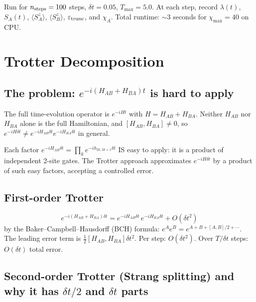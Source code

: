 \documentclass[11pt, a4paper]{article}
\begin{document}
Run for $n_{\rm steps} = 100$ steps, $\delta t = 0.05$, $T_{\max} = 5.0$. At each step, record $\lambda(t)$, $S_A(t)$, $\langle S^z_A\rangle$, $\langle S^z_B\rangle$, $\varepsilon_{\rm trunc}$, and $\chi_A$. Total runtime: $\sim$3 seconds for $\chi_{\max} = 40$ on CPU.

\section{Trotter Decomposition}
\label{sec:trotter}

\subsection{The problem: $e^{-i(H_{AB}+H_{BA})t}$ is hard to apply}

The full time-evolution operator is $e^{-iHt}$ with $H = H_{AB} + H_{BA}$. Neither $H_{AB}$ nor $H_{BA}$ alone is the full Hamiltonian, and $[H_{AB}, H_{BA}] \neq 0$, so $e^{-iH\delta t} \neq e^{-iH_{AB}\delta t} e^{-iH_{BA}\delta t}$ in general.

Each factor $e^{-iH_{AB}\delta t} = \prod_k e^{-ih_{2k,2k+1}\delta t}$ IS easy to apply: it is a product of independent 2-site gates. The Trotter approach approximates $e^{-iH\delta t}$ by a product of such easy factors, accepting a controlled error.

\subsection{First-order Trotter}

\begin{equation}
  e^{-i(H_{AB}+H_{BA})\delta t} = e^{-iH_{AB}\delta t}\, e^{-iH_{BA}\delta t} + O(\delta t^2)
\end{equation}
by the Baker--Campbell--Hausdorff (BCH) formula: $e^A e^B = e^{A+B+[A,B]/2+\cdots}$. The leading error term is $\tfrac{1}{2}[H_{AB}, H_{BA}] \delta t^2$. Per step: $O(\delta t^2)$. Over $T/\delta t$ steps: $O(\delta t)$ total error.

\subsection{Second-order Trotter (Strang splitting) and why it has $\delta t/2$ and $\delta t$ parts}
\end{document}

